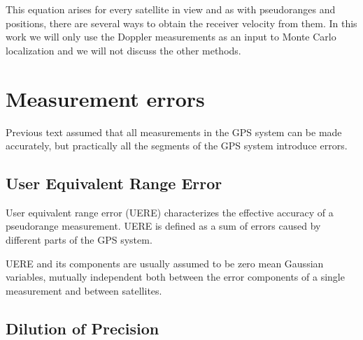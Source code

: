 This equation arises for every satellite in view and
as with pseudoranges and positions, there are several ways to obtain the receiver velocity
from them.
In this work we will only use the Doppler measurements as an input to Monte Carlo localization
and we will not discuss the other methods.

\section{Measurement errors}
\label{sec:gps-errors}

Previous text assumed that all measurements in the GPS system can be made accurately,
but practically all the segments of the GPS system introduce errors.

\subsection{User Equivalent Range Error}
\label{sec:gps-uere}


User equivalent range error (UERE) characterizes the effective accuracy of a pseudorange measurement.
UERE is defined as a sum of errors caused by different parts of the GPS system.

UERE and its components are usually assumed to be zero mean Gaussian variables,
mutually independent both between the error components of a single measurement and between satellites.

\subsection{Dilution of Precision}
\label{sec:gps-dop}

